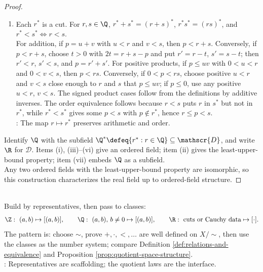 \begin{theorem}
\begin{proof}
\begin{enumerate}[label=(\roman*)]
\item {}
Each $r^*$ is a cut. For $r,s\in\Q$, $r^*+s^*=(r+s)^*$, $r^*s^*=(rs)^*$, and $r^*<s^*\Longleftrightarrow r<s$.\\
For addition, if $p=u+v$ with $u<r$ and $v<s$, then $p<r+s$. Conversely, if $p<r+s$, choose $t>0$ with $2t=r+s-p$ and put $r'=r-t$, $s'=s-t$; then $r'<r$, $s'<s$, and $p=r'+s'$. For positive products, if $p\leq uv$ with $0<u<r$ and $0<v<s$, then $p<rs$. Conversely, if $0<p<rs$, choose positive $u<r$ and $v<s$ close enough to $r$ and $s$ that $p\leq uv$; if $p\leq0$, use any positive $u<r$, $v<s$. The signed product cases follow from the definitions by additive inverses. The order equivalence follows because $r<s$ puts $r$ in $s^*$ but not in $r^*$, while $r^*<s^*$ gives some $p<s$ with $p\notin r^*$, hence $r\leq p<s$.\\
: The map $r\mapsto r^*$ preserves arithmetic and order.
\end{enumerate}
Identify $\Q$ with the subfield $\Q^*\defeq\{r^*:r\in\Q\}\subseteq\mathscr{D}$, and write $\R$ for $\mathscr{D}$. Items (i), (iii)--(vi) give an ordered field; item (ii) gives the least-upper-bound property; item (vii) embeds $\Q$ as a subfield.\\
Any two ordered fields with the least-upper-bound property are isomorphic, so this construction characterizes the real field up to ordered-field structure.
\end{proof}
\end{theorem}

\begin{perspective} \label{per:number-systems-from-representatives} \\
Build by representatives, then pass to classes:
\begin{align}
\Z:\ (a,b)\mapsto[(a,b)],\qquad
\Q:\ (a,b),\,b\neq0\mapsto[(a,b)],\qquad
\R:\ \text{cuts or Cauchy data}\mapsto[\cdot]. \nonumber
\end{align}
The pattern is: choose $\sim$, prove $+,\cdot,<,\ldots$ are well defined on $X/{\sim}$, then use the classes as the number system; compare Definition \ref{def:relations-and-equivalence} and Proposition \ref{prop:quotient-space-structure}.\\
: Representatives are scaffolding; the quotient laws are the interface.
\end{perspective}

